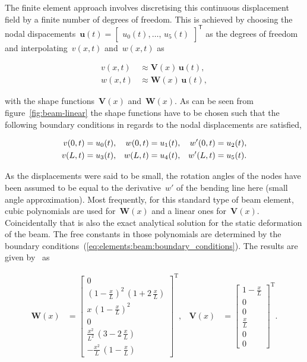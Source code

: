 The finite element approach involves discretising this continuous displacement field by a finite number of degrees of freedom. This is achieved by choosing the nodal dispacements~$\boldsymbol{u}(t) = \begin{bmatrix}u_{0}(t),\ldots,\,u_{5}(t)\end{bmatrix}^\mathsf{T}$ as the degrees of freedom and interpolating~$v(x,t)$ and~$w(x,t)$ as

\begin{align}
v(x,t) &\approx \boldsymbol{V}(x)\,\boldsymbol{u}(t),\\
w(x,t) &\approx \boldsymbol{W}(x)\,\boldsymbol{u}(t),
\end{align}

with the shape functions~$\boldsymbol{V}(x)$ and~$\boldsymbol{W}(x)$.
As can be seen from figure~\ref{fig:beam-linear} the shape functions have to be chosen such that the following boundary conditions in regards to the nodal displacements are satisfied,

\begin{align}
v(0,t) &= u_{0}(t), & w(0,t) &= u_{1}(t), & w'(0,t) &= u_{2}(t),\notag\\
v(L,t) &= u_{3}(t), & w(L,t) &= u_{4}(t), & w'(L,t) &= u_{5}(t).\label{eq:elements:beam:boundary_conditions}
\end{align}

As the displacements were said to be small, the rotation angles of the nodes have been assumed to be equal to the derivative~$w'$ of the bending line here (small angle approximation).
Most frequently, for this standard type of beam element, cubic polynomials are used for~$\boldsymbol{W}(x)$ and a linear ones for~$\boldsymbol{V}(x)$. Coincidentally that is also the exact analytical solution for the static deformation of the beam. The free constants in those polynomials are determined by the boundary conditions~(\ref{eq:elements:beam:boundary_conditions}). The results are given by~\cite{bib:tm4} as

\begin{align}
\boldsymbol{W}(x) &=
\begin{bmatrix}
0\\
(1-\frac{x}{L})^2\,(1+2\,\frac{x}{L})\\
x\,(1-\frac{x}{L})^2\\
0\\
\frac{x^2}{L^2}\,(3-2\,\frac{x}{L})\\
-\frac{x^2}{L}\,(1-\frac{x}{L})
\end{bmatrix}^\mathrm{T},
&
\boldsymbol{V}(x) &=
\begin{bmatrix}
1-\frac{x}{L}\\
0\\
0\\
\frac{x}{L}\\
0\\
0
\end{bmatrix}^\mathrm{T}.
\end{align}

